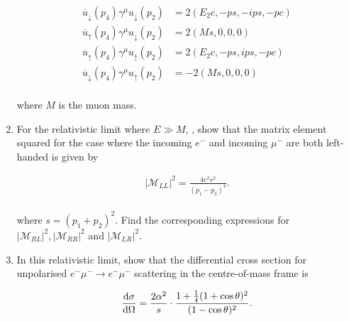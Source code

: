 \begin{problem}{6.7}
\begin{enumerate}[label=(\alph*)]
        \begin{align*}
            \overbar{u}_\downarrow(p_4)\gamma^\mu u_\downarrow(p_2) &= 2 (E_2 c , -ps,-ips, -pc) \\
            \overbar{u}_\uparrow(p_4)\gamma^\mu u_\downarrow(p_2)   &= 2 (Ms,0,0,0) \\
            \overbar{u}_\uparrow(p_4)\gamma^\mu u_\uparrow(p_2) &= 2 (E_2 c, -ps ,ips,-pc) \\
            \overbar{u}_\downarrow(p_4)\gamma^\mu u_\uparrow(p_2) &= -2 (Ms,0,0,0)
        \end{align*}\\
        where $M$ is the muon mass.

        \item For the relativistic limit where $E\gg M$, , show that the matrix element squared for the case where the incoming $e^-$ and incoming $\mu^-$ are both left-handed is given by
        
        \begin{align*}
            |\mathcal{M}_{LL}|^2 = \frac{4e^2s^2}{(p_1-p_3)^4}.
        \end{align*}\\
        where $s=(p_1+p_2)^2$. Find the corresponding expressions for $|\mathcal{M}_{RL}|^2,|\mathcal{M}_{RR}|^2$ and $|\mathcal{M}_{LR}|^2$.

        \item In this relativistic limit, show that the differential cross section for unpolarised $e^-\mu^- \to e^-\mu^-$ scattering in the centre-of-mass frame is
        
        \begin{align*}
            \frac{\mathop{}\!\mathrm{d}\sigma}{\mathop{}\!\mathrm{d}\Omega} = \frac{2\alpha^2}{s} \cdot \frac{1+\frac{1}{4}(1+\cos\theta)^2}{(1-\cos\theta)^2}.\\
        \end{align*}
        
    \end{enumerate}
\end{problem}

